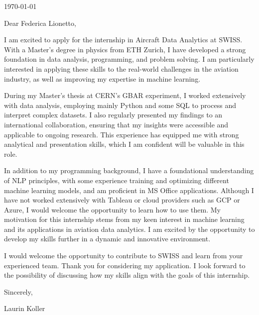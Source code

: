 \documentclass[10pt, a4paper]{article}
\begin{document}
\makeprofile %

\makecontact %

\today %

\makeemployerinfo %

Dear Federica Lionetto,

I am excited to apply for the internship in Aircraft Data Analytics at SWISS. With a Master’s degree in physics from ETH Zurich, I have developed a strong foundation in data analysis, programming, and problem solving. I am particularly interested in applying these skills to the real-world challenges in the aviation industry, as well as improving my expertise in machine learning.

During my Master’s thesis at CERN’s GBAR experiment, I worked extensively with data analysis, employing mainly Python and some SQL to process and interpret complex datasets. I also regularly presented my findings to an international collaboration, ensuring that my insights were accessible and applicable to ongoing research. This experience has equipped me with strong analytical and presentation skills, which I am confident will be valuable in this role.

In addition to my programming background, I have a foundational understanding of NLP principles, with some experience training and optimizing different machine learning models, and am proficient in MS Office applications. Although I have not worked extensively with Tableau or cloud providers such as GCP or Azure, I would welcome the opportunity to learn how to use them. My motivation for this internship stems from my keen interest in machine learning and its applications in aviation data analytics. I am excited by the opportunity to develop my skills further in a dynamic and innovative environment.

I would welcome the opportunity to contribute to SWISS and learn from your experienced team. Thank you for considering my application. I look forward to the possibility of discussing how my skills align with the goals of this internship.

Sincerely,

Laurin Koller
\end{document}
